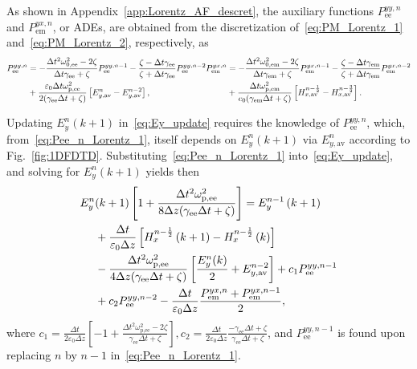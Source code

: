 \documentclass[journal]{IEEEtran}
\begin{document}
As shown in Appendix~\ref{app:Lorentz_AF_descret}, the auxiliary functions $P_\textrm{ee}^{yy,n}$ and $P_\textrm{em}^{yx,n}$, or ADEs, are obtained from the discretization of~\eqref{eq:PM_Lorentz_1} and~\eqref{eq:PM_Lorentz_2}, respectively, as
\begin{subequations}\label{eq:Pee_n_Lorentz}
\begin{align}\label{eq:Pee_n_Lorentz_1}
  P_\textrm{ee}^{yy,n}&=-\frac{\Delta t^2\omega^2_\textrm{0,ee}-2\zeta}{\Delta t\gamma_\textrm{ee} +\zeta}P_\textrm{ee}^{yy,n-1}-\frac{\zeta-\Delta t\gamma_\textrm{ee}}{\zeta+\Delta t\gamma_\textrm{ee}}P_\textrm{ee}^{yy,n-2}\\\notag&+\frac{\varepsilon_0\Delta t\omega^2_\textrm{p,ee}}{2(\gamma_\textrm{ee}\Delta t+\zeta)}\left[ E_{y,\textrm{av}}^n-E_{y,\textrm{av}}^{n-2}\right],
  \end{align}
  \begin{align}\label{eq:Pee_n_Lorentz_2}
  P_\textrm{em}^{yx,n}&=-\frac{\Delta t^2\omega^2_\textrm{0,em}-2\zeta}{\Delta t\gamma_\textrm{em} +\zeta}P_\textrm{em}^{yx,n-1}-\frac{\zeta-\Delta t\gamma_\textrm{em}}{\zeta+\Delta t\gamma_\textrm{em}}P_\textrm{em}^{yx,n-2}\\\notag&+\frac{\Delta t\omega^2_\textrm{p,em}}{c_0(\gamma_\textrm{em}\Delta t+\zeta)}\left[ H_{x,\textrm{av}}^{n-\frac{1}{2}}-H_{x,\textrm{av}}^{n-\frac{3}{2}}\right].
\end{align}
\end{subequations}

Updating $E_y^n(k+1)$ in~\eqref{eq:Ey_update} requires the knowledge of $P_\textrm{ee}^{yy,n}$, which, from~\eqref{eq:Pee_n_Lorentz_1}, itself depends on $E_y^n(k+1)$ via $E^n_{y,\text{av}}$ according to Fig.~\ref{fig:1DFDTD}. Substituting~\eqref{eq:Pee_n_Lorentz_1} into~\eqref{eq:Ey_update}, and solving for $E_y^n(k+1)$ yields then
\begin{align}\label{eq:Ey_final_update}
E_y^n&(k+1)\left[1+\frac{\Delta t^2\omega^2_\textrm{p,ee}}{8\Delta z(\gamma_\textrm{ee}\Delta t+\zeta)}\right]=E_y^{n-1}\left( k+1\right)
\\\notag&+\frac{\Delta t}{\varepsilon_0\Delta z}\left[H_x^{n-\frac{1}{2}}\left(k+1\right)-H_x^{n-\frac{1}{2}}\left(k\right)\right]\\\notag&-\frac{\Delta t^2\omega^2_\textrm{p,ee}}{4\Delta z(\gamma_\textrm{ee}\Delta t+\zeta)}\left[ \frac{E_{y}^n(k)}{2}+E_{y,\textrm{av}}^{n-2}\right]+c_1P_\textrm{ee}^{yy,n-1}\\\notag &+c_2P_\textrm{ee}^{yy,n-2}-\frac{\Delta t}{\varepsilon_0\Delta z}\frac{P_\textrm{em}^{yx,n}+P_\textrm{em}^{yx,n-1}}{2},
\end{align}
where $c_1=\frac{\Delta t}{2\varepsilon_0\Delta z}\left[-1+\frac{\Delta t^2\omega^2_\textrm{p,ee}-2\zeta}{\gamma_\textrm{ee}\Delta t+\zeta}\right], c_2=\frac{\Delta t}{2\varepsilon_0\Delta z}\frac{-\gamma_\textrm{ee}\Delta t+\zeta}{\gamma_\textrm{ee}\Delta t+\zeta}$, and $P_\textrm{ee}^{yy,n-1}$ is found upon replacing $n$ by $n-1$ in~\eqref{eq:Pee_n_Lorentz_1}.
\end{document}
